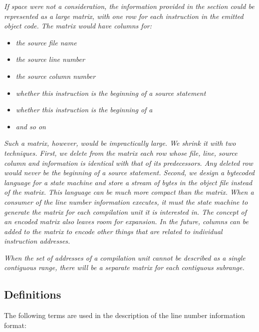 \textit{If space were not a consideration, the information provided
in the \dotdebugline{} 
section could be represented as a large
matrix, with one row for each instruction in the emitted
object code. The matrix would have columns for:}
\begin{itemize}
\item \textit{the source file name}
\item \textit{the source line number}
\item \textit{the source column number}
\item \textit{whether this instruction is the beginning of a source statement}
\item \textit{whether this instruction is the beginning of a }
\item \textit{and so on}
\end{itemize}
\textit{Such a matrix, however, would be impractically large. We
shrink it with two techniques. First, we delete from
the matrix each row whose file, line, source column and
 information 
is identical with that of its
predecessors. Any deleted row would never be the beginning of
a source statement. Second, we design a byte\dash coded language
for a state machine and store a stream of bytes in the object
file instead of the matrix. This language can be much more
compact than the matrix. When a consumer of the line number
information executes, it must  the state machine
to generate the matrix for each compilation unit it is
interested in.  The concept of an encoded matrix also leaves
room for expansion. In the future, columns can be added to the
matrix to encode other things that are related to individual
instruction addresses.}

\textit{When the set of addresses of a compilation unit cannot be
described as a single contiguous range, there will be a
separate matrix for each contiguous subrange.}

\subsection{Definitions}

The following terms are used in the description of the line
number information format:


